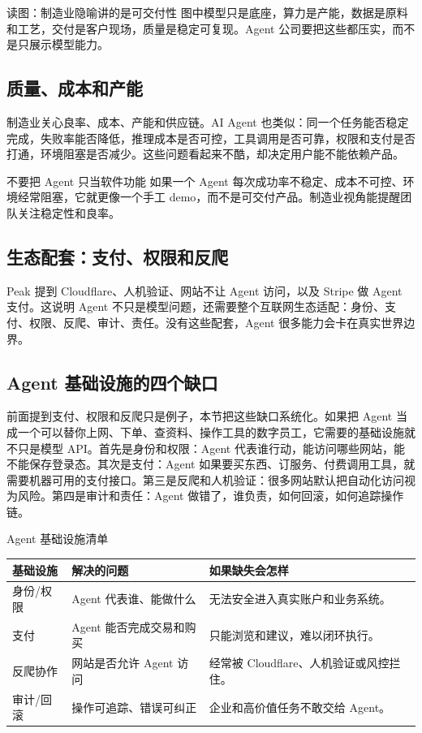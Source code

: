 \documentclass[a4paper]{article}
\begin{document}
\begin{knowledgebox}{读图：制造业隐喻讲的是可交付性}
图中模型只是底座，算力是产能，数据是原料和工艺，交付是客户现场，质量是稳定可复现。Agent 公司要把这些都压实，而不是只展示模型能力。
\end{knowledgebox}

\subsection{质量、成本和产能}

制造业关心良率、成本、产能和供应链。AI Agent 也类似：同一个任务能否稳定完成，失败率能否降低，推理成本是否可控，工具调用是否可靠，权限和支付是否打通，环境阻塞是否减少。这些问题看起来不酷，却决定用户能不能依赖产品。

\begin{warningbox}{不要把 Agent 只当软件功能}
如果一个 Agent 每次成功率不稳定、成本不可控、环境经常阻塞，它就更像一个手工 demo，而不是可交付产品。制造业视角能提醒团队关注稳定性和良率。
\end{warningbox}

\subsection{生态配套：支付、权限和反爬}

Peak 提到 Cloudflare、人机验证、网站不让 Agent 访问，以及 Stripe 做 Agent 支付。这说明 Agent 不只是模型问题，还需要整个互联网生态适配：身份、支付、权限、反爬、审计、责任。没有这些配套，Agent 很多能力会卡在真实世界边界。

\subsection{Agent 基础设施的四个缺口}

前面提到支付、权限和反爬只是例子，本节把这些缺口系统化。如果把 Agent 当成一个可以替你上网、下单、查资料、操作工具的数字员工，它需要的基础设施就不只是模型 API。首先是身份和权限：Agent 代表谁行动，能访问哪些网站，能不能保存登录态。其次是支付：Agent 如果要买东西、订服务、付费调用工具，就需要机器可用的支付接口。第三是反爬和人机验证：很多网站默认把自动化访问视为风险。第四是审计和责任：Agent 做错了，谁负责，如何回滚，如何追踪操作链。

\begin{knowledgebox}{Agent 基础设施清单}
\begin{tabularx}{\textwidth}{p{}p{}X}
\toprule
基础设施 & 解决的问题 & 如果缺失会怎样 \\
\midrule
身份/权限 & Agent 代表谁、能做什么 & 无法安全进入真实账户和业务系统。 \\
支付 & Agent 能否完成交易和购买 & 只能浏览和建议，难以闭环执行。 \\
反爬协作 & 网站是否允许 Agent 访问 & 经常被 Cloudflare、人机验证或风控拦住。 \\
审计/回滚 & 操作可追踪、错误可纠正 & 企业和高价值任务不敢交给 Agent。 \\
\bottomrule
\end{tabularx}
\end{knowledgebox}
\end{document}
